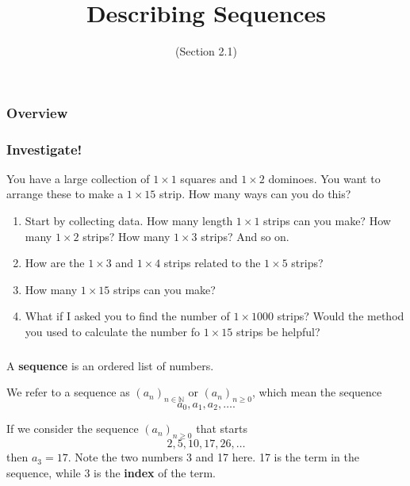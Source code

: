 \documentclass[11pt, compress]{beamer}
\title{Describing Sequences}
\subtitle{(Section 2.1)}
\author{}
\date[]{}
\newcommand{\terminology}[1]{\textbf{#1}}
\newcommand{\N}{\mathbb N}
\begin{document}
\begin{frame}
\maketitle 
\end{frame}
 
\begin{frame}
\frametitle{Overview}
\tableofcontents 
\end{frame}
 
\begin{frame}
\frametitle{Investigate!}
 You have a large collection of \(1\times 1\) squares and \(1\times 2\) dominoes. You want to arrange these to make a \(1 \times 15\) strip. How many ways can you do this?\begin{enumerate}
\item{} Start by collecting data. How many length \(1\times 1\) strips can you make? How many \(1\times 2\) strips? How many \(1\times 3\) strips? And so on.


\item{} How are the \(1\times 3\) and \(1 \times 4\) strips related to the \(1\times 5\) strips?


\item{} How many \(1\times 15\) strips can you make?


\item{} What if I asked you to find the number of \(1\times 1000\) strips? Would the method you used to calculate the number fo \(1 \times 15\) strips be helpful?

\end{enumerate}

\end{frame}
 
\begin{frame}
\frametitle{}
A \terminology{sequence} is an ordered list of numbers.
 
\pause \vfill 

We refer to a sequence as \((a_n)_{n \in \N}\) or \((a_n)_{n \ge 0}\), which mean the sequence%
\begin{equation*}
a_0, a_1, a_2, \ldots\text{.}
\end{equation*}

 
\pause \vfill 

If we consider the sequence \((a_n)_{n \ge 0}\) that starts%
\begin{equation*}
2, 5, 10, 17, 26,\ldots
\end{equation*}
then \(a_3 = 17\).  Note the two numbers 3 and 17 here.  17 is the term in the sequence, while 3 is the \terminology{index} of the term.
\end{frame}
 
\end{document}

